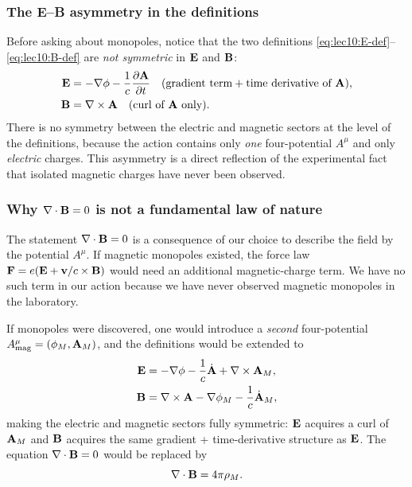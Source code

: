 \subsubsection*{The E–B asymmetry in the definitions}

Before asking about monopoles, notice that the two definitions
\eqref{eq:lec10:E-def}--\eqref{eq:lec10:B-def} are \emph{not symmetric} in $\mathbf{E}$ and $\mathbf{B}$:
\begin{align*}
  \mathbf{E} &= -\nabla\phi - \frac{1}{c}\frac{\partial\mathbf{A}}{\partial t}
        \quad (\text{gradient term} + \text{time derivative of }\mathbf{A}), \\
  \mathbf{B} &= \nabla\times\mathbf{A}
        \quad (\text{curl of }\mathbf{A}\text{ only}).
\end{align*}
There is no symmetry between the electric and magnetic sectors at the level of the definitions,
because the action contains only \emph{one} four-potential $A^\mu$ and only \emph{electric} charges.
This asymmetry is a direct reflection of the experimental fact that isolated magnetic charges have
never been observed.

\subsubsection*{Why $\nabla\cdot\mathbf{B}=0$ is not a fundamental law of nature}

The statement $\nabla\cdot\mathbf{B}=0$ is a consequence of our choice to describe the field by the
potential $A^\mu$.  If magnetic monopoles existed, the force law
$\mathbf{F}=e(\mathbf{E}+\mathbf{v}/c\times\mathbf{B})$ would need an additional magnetic-charge term.  We have
no such term in our action because we have never observed magnetic monopoles in the laboratory.

If monopoles were discovered, one would introduce a \emph{second} four-potential
$A^\mu_{\rm mag}=(\phi_M,\mathbf{A}_M)$, and the definitions would be extended to
\begin{align}
  \mathbf{E} &= -\nabla\phi - \frac{1}{c}\dot{\mathbf{A}} + \nabla\times\mathbf{A}_M , \label{eq:lec10:E-monopole}\\
  \mathbf{B} &= \nabla\times\mathbf{A} - \nabla\phi_M - \frac{1}{c}\dot{\mathbf{A}}_M , \label{eq:lec10:B-monopole}
\end{align}
making the electric and magnetic sectors fully symmetric: $\mathbf{E}$ acquires a curl of $\mathbf{A}_M$ and
$\mathbf{B}$ acquires the same gradient + time-derivative structure as $\mathbf{E}$.  The equation
$\nabla\cdot\mathbf{B}=0$ would be replaced by
\begin{equation}\label{eq:lec10:divB-monopole}
  \nabla\cdot\mathbf{B} = 4\pi\rho_M .
\end{equation}

